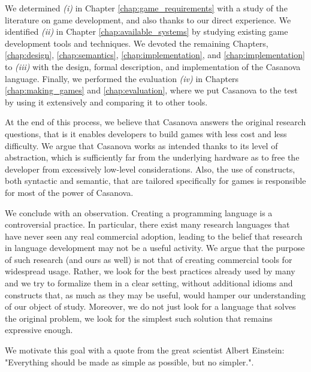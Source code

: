 We determined \textit{(i)} in Chapter \ref{chap:game_requirements} with a study of the literature on game development, and also thanks to our direct experience. We identified \textit{(ii)} in Chapter \ref{chap:available_systems} by studying existing game development tools and techniques. We devoted the remaining Chapters, \ref{chap:design}, \ref{chap:semantics}, \ref{chap:implementation}, and \ref{chap:implementation} to \textit{(iii)} with the design, formal description, and implementation of the Casanova language. Finally, we performed the evaluation \textit{(iv)} in Chapters \ref{chap:making_games} and \ref{chap:evaluation}, where we put Casanova to the test by using it extensively and comparing it to other tools.

At the end of this process, we believe that Casanova answers the original research questions, that is it enables developers to build games with less cost and less difficulty. We argue that Casanova works as intended thanks to its level of abstraction, which is sufficiently far from the underlying hardware as to free the developer from excessively low-level considerations. Also, the use of constructs, both syntactic and semantic, that are tailored specifically for games is responsible for most of the power of Casanova.

We conclude with an observation. Creating a programming language is a controversial practice. In particular, there exist many research languages that have never seen any real commercial adoption, leading to the belief that research in language development may not be a useful activity. We argue that the purpose of such research (and ours as well) is not that of creating commercial tools for widespread usage. Rather, we look for the best practices already used by many and we try to formalize them in a clear setting, without additional idioms and constructs that, as much as they may be useful, would hamper our understanding of our object of study. Moreover, we do not just look for a language that solves the original problem, we look for the simplest such solution that remains expressive enough.

We motivate this goal with a quote from the great scientist Albert Einstein: "Everything should be made as simple as possible, but no simpler.".
